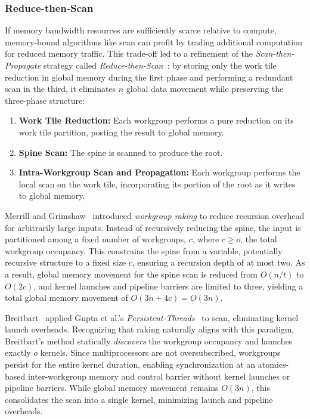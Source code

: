 \documentclass[sigconf,screen]{acmart}
\begin{document}
\subsubsection{Reduce-then-Scan}
If memory bandwidth resources are sufficiently scarce relative to compute, memory-bound algorithms like scan can profit by trading additional computation for reduced memory traffic. This trade-off led to a refinement of the \emph{Scan-then-Propagate} strategy called \emph{Reduce-then-Scan}~\cite{10.1145/1375527.1375559, Merrill2009, 10.1109/TPDS.2012.336, 10.5555/2031978.2032029}: by storing only the work tile reduction in global memory during the first phase and performing a redundant scan in the third, it eliminates $n$ global data movement while preserving the three-phase structure:
\begin{enumerate}
  \item \textbf{Work Tile Reduction:} Each workgroup performs a pure reduction on its work tile partition, posting the result to global memory.
  \item \textbf{Spine Scan:} The spine is scanned to produce the root.
  \item \textbf{Intra-Workgroup Scan and Propagation:} Each workgroup performs the local scan on the work tile, incorporating its portion of the root as it writes to global memory.
\end{enumerate}

Merrill and Grimshaw~\cite{Merrill2009} introduced \emph{workgroup raking} to reduce recursion overhead for arbitrarily large inputs. Instead of recursively reducing the spine, the input is partitioned among a fixed number of workgroups, $c$, where $c \geq o$, the total workgroup occupancy. This constrains the spine from a variable, potentially recursive structure to a fixed size $c$, ensuring a recursion depth of at most two. As a result, global memory movement for the spine scan is reduced from $O(n/t)$ to $O(2c)$, and kernel launches and pipeline barriers are limited to three, yielding a total global memory movement of $O(3n + 4c) = O(3n)$.

Breitbart~\cite{10.5555/2031978.2032029} applied Gupta et al.'s \emph{Persistent-Threads}~\cite{gupta2012} to scan, eliminating kernel launch overheads. Recognizing that raking naturally aligns with this paradigm, Breitbart's method statically \emph{discovers} the workgroup occupancy and launches exactly $o$ kernels. Since multiprocessors are not oversubscribed, workgroups persist for the entire kernel duration, enabling synchronization at an atomics-based inter-workgroup memory and control barrier without kernel launches or pipeline barriers. While global memory movement remains $O(3n)$, this consolidates the scan into a single kernel, minimizing launch and pipeline overheads.
\end{document}
